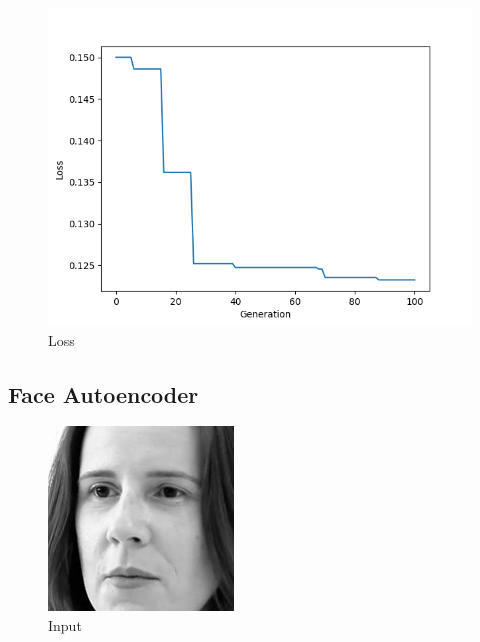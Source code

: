 \documentclass[twoside,conference,a4paper]{IEEEtran}
\begin{document}
\begin{figure}[htbp]
        \centering \includegraphics[width=1\columnwidth]{./ia_proj_images/mnist_auto_encoder/config_inicial_fixed_epochs_loss.png}
        \caption{
                \label{fig:loss_mnist_autoencoder}
                Loss
        }
\end{figure}

\subsection{Face Autoencoder}


\begin{figure}[htbp]
        \centering \includegraphics[width=.7\columnwidth]{./ia_proj_images/faces_auto_encoder/esther.jpg}
        \caption{
                \label{fig:esther}
                Input
        }
\end{figure}
\end{document}
